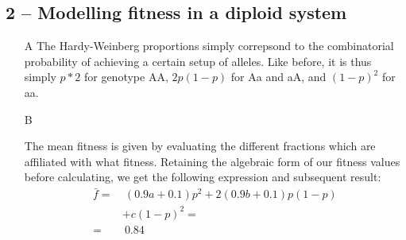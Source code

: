 \documentclass[10pt]{article}\usepackage[]{graphicx}\usepackage[]{color}
\theoremstyle{plain}
\begin{document}
\begin{multicols*}{2}
\subsection*{2 -- Modelling fitness in a diploid system}
\begin{enumerate}
  \item[A] The Hardy-Weinberg proportions simply correpsond to the combinatorial
    probability of achieving a certain setup of alleles. Like before, it is
    thus simply $p*2$ for genotype AA, $2p(1-p)$ for Aa and aA, and $(1-p)^2$
    for aa. 
  \item[B] 

The mean fitness is given by evaluating the different fractions which are
affiliated with what fitness. Retaining the algebraic form of our fitness
values before calculating, we get the following expression and subsequent result:
    \begin{align*}
      \bar f =&~(0.9a + 0.1)p^2 + 2(0.9b + 0.1)p(1-p) \\&+ c(1-p)
      ^2 = \\
      =&~0.84
    \end{align*}
 



\end{enumerate}
\end{multicols*}
\end{document}
